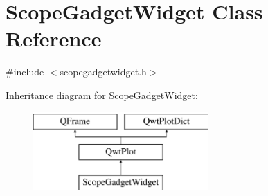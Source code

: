 \hypertarget{class_scope_gadget_widget}{\section{Scope\-Gadget\-Widget Class Reference}
\label{class_scope_gadget_widget}
}


{\ttfamily \#include $<$scopegadgetwidget.\-h$>$}

Inheritance diagram for Scope\-Gadget\-Widget\-:\begin{figure}[H]
\begin{center}
\leavevmode
\includegraphics[height=3.000000cm]{class_scope_gadget_widget}
\end{center}
\end{figure}
